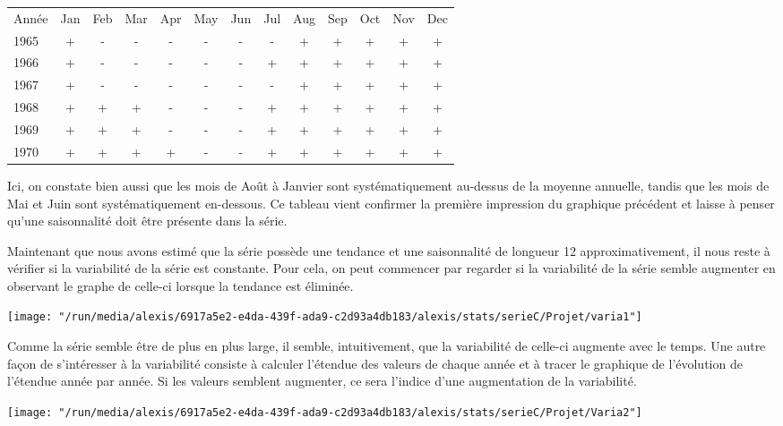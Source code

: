 \documentclass[11pt,a4paper]{article}
\begin{document}
\begin{tabular}{ l || c | c | c | c | c | c | c | c | c | c | c | c }
\hline
	
 Année & Jan & Feb & Mar & Apr & May & Jun & Jul & Aug & Sep & Oct & Nov & Dec \\
1965   & +   & -   & -   & -   & -   & -   & -   & +   & +   & +   & +   & +   \\
1966   & +   & -   & -   & -   & -   & -   & +   & +   & +   & +   & +   & + \\
1967   & +   & -   & -   & -   & -   & -   & -   & +   & +   & +   & +   & + \\
1968   & +   & +   & +   & -   & -   & -   & +   & +   & +   & +   & +   & + \\
1969   & +   & +   & +   & -   & -   & -   & +   & +   & +   & +   & +   & + \\
1970   & +   & +   & +   & +   & -   & -   & +   & +   & +   & +   & +   & + \\

\end{tabular}
\bigskip

Ici, on constate bien aussi que les mois de Août à Janvier sont systématiquement au-dessus de la moyenne annuelle, tandis que les mois de Mai et Juin sont systématiquement en-dessous. Ce tableau vient confirmer la première impression du graphique précédent et laisse à penser qu'une saisonnalité doit être présente dans la série.
\bigskip

	Maintenant que nous avons estimé que la série possède une tendance et une saisonnalité de longueur 12 approximativement, il nous reste à vérifier si la variabilité de la série est constante. Pour cela, on peut commencer par regarder si la variabilité de la série semble augmenter en observant le graphe de celle-ci lorsque la tendance est éliminée.
\begin{center}

\texttt{[image: "/run/media/alexis/6917a5e2-e4da-439f-ada9-c2d93a4db183/alexis/stats/serieC/Projet/varia1"]}
\end{center}

Comme la série semble être de plus en plus large, il semble, intuitivement, que la variabilité de celle-ci augmente avec le temps. Une autre façon de s'intéresser à la variabilité consiste à calculer l'étendue des valeurs de chaque année et à tracer le graphique de l'évolution de l'étendue année par année. Si les valeurs semblent augmenter, ce sera l'indice d'une augmentation de la variabilité.
\begin{center}

\texttt{[image: "/run/media/alexis/6917a5e2-e4da-439f-ada9-c2d93a4db183/alexis/stats/serieC/Projet/Varia2"]}
\end{center}
\end{document}
